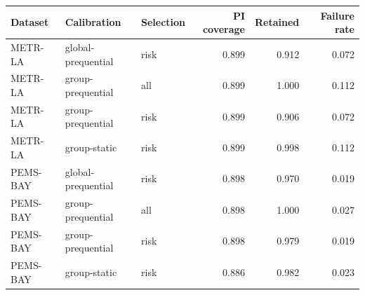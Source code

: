 \begin{tabular}{lllrrr}
\toprule
Dataset & Calibration & Selection & PI coverage & Retained & Failure rate \\
\midrule
METR-LA & global-prequential & risk & 0.899 & 0.912 & 0.072 \\
METR-LA & group-prequential & all & 0.899 & 1.000 & 0.112 \\
METR-LA & group-prequential & risk & 0.899 & 0.906 & 0.072 \\
METR-LA & group-static & risk & 0.899 & 0.998 & 0.112 \\
PEMS-BAY & global-prequential & risk & 0.898 & 0.970 & 0.019 \\
PEMS-BAY & group-prequential & all & 0.898 & 1.000 & 0.027 \\
PEMS-BAY & group-prequential & risk & 0.898 & 0.979 & 0.019 \\
PEMS-BAY & group-static & risk & 0.886 & 0.982 & 0.023 \\
\bottomrule
\end{tabular}
